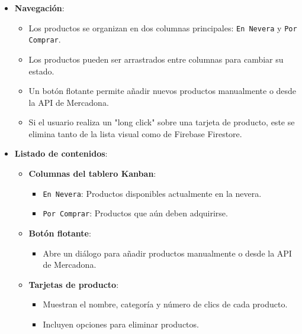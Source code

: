 \documentclass{article}
\begin{document}
\begin{flushleft}
\begin{itemize}
    \item \textbf{Navegaci\'on}:
    \begin{itemize}
        \item Los productos se organizan en dos columnas principales: \texttt{En Nevera} y \texttt{Por Comprar}.
        \item Los productos pueden ser arrastrados entre columnas para cambiar su estado.
        \item Un bot\'on flotante permite a\~nadir nuevos productos manualmente o desde la API de Mercadona.
        \item Si el usuario realiza un "long click" sobre una tarjeta de producto, este se elimina tanto de la lista visual como de Firebase Firestore.
    \end{itemize}

    \item \textbf{Listado de contenidos}:
    \begin{itemize}
        \item \textbf{Columnas del tablero Kanban}:
        \begin{itemize}
            \item \texttt{En Nevera}: Productos disponibles actualmente en la nevera.
            \item \texttt{Por Comprar}: Productos que a\'un deben adquirirse.
        \end{itemize}
        \item \textbf{Bot\'on flotante}:
        \begin{itemize}
            \item Abre un di\'alogo para a\~nadir productos manualmente o desde la API de Mercadona.
        \end{itemize}
        \item \textbf{Tarjetas de producto}:
        \begin{itemize}
            \item Muestran el nombre, categor\'ia y n\'umero de clics de cada producto.
            \item Incluyen opciones para eliminar productos.
        \end{itemize}
    \end{itemize}


\end{itemize}
\end{flushleft}
\end{document}
